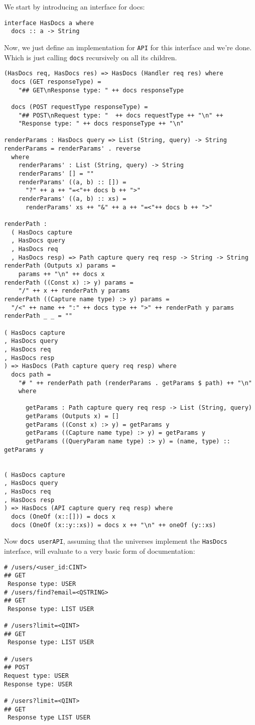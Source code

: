 \documentclass[12pt,a4paper]{article}
\begin{document}
We start by introducing an interface for docs:
\begin{verbatim}
interface HasDocs a where
  docs :: a -> String
\end{verbatim}
Now, we just define an implementation for \texttt{API} for this interface and we're done. Which is just calling \texttt{docs} recursively on all its children.

\begin{verbatim}
(HasDocs req, HasDocs res) => HasDocs (Handler req res) where
  docs (GET responseType) =
    "## GET\nResponse type: " ++ docs responseType

  docs (POST requestType responseType) =
    "## POST\nRequest type: "  ++ docs requestType ++ "\n" ++
    "Response type: " ++ docs responseType ++ "\n"

renderParams : HasDocs query => List (String, query) -> String
renderParams = renderParams' . reverse
  where
    renderParams' : List (String, query) -> String
    renderParams' [] = ""
    renderParams' ((a, b) :: []) =
      "?" ++ a ++ "=<"++ docs b ++ ">"
    renderParams' ((a, b) :: xs) =
      renderParams' xs ++ "&" ++ a ++ "=<"++ docs b ++ ">"

renderPath : 
  ( HasDocs capture
  , HasDocs query
  , HasDocs req
  , HasDocs resp) => Path capture query req resp -> String -> String
renderPath (Outputs x) params = 
    params ++ "\n" ++ docs x
renderPath ((Const x) :> y) params =
    "/" ++ x ++ renderPath y params
renderPath ((Capture name type) :> y) params =
  "/<" ++ name ++ ":" ++ docs type ++ ">" ++ renderPath y params
renderPath _ _ = ""

( HasDocs capture
, HasDocs query
, HasDocs req
, HasDocs resp
) => HasDocs (Path capture query req resp) where
  docs path =
    "# " ++ renderPath path (renderParams . getParams $ path) ++ "\n"
    where

      getParams : Path capture query req resp -> List (String, query)
      getParams (Outputs x) = []
      getParams ((Const x) :> y) = getParams y
      getParams ((Capture name type) :> y) = getParams y
      getParams ((QueryParam name type) :> y) = (name, type) :: getParams y


( HasDocs capture
, HasDocs query
, HasDocs req
, HasDocs resp
) => HasDocs (API capture query req resp) where
  docs (OneOf (x::[])) = docs x
  docs (OneOf (x::y::xs)) = docs x ++ "\n" ++ oneOf (y::xs)
\end{verbatim}

Now \texttt{docs userAPI}, assuming that the universes implement
the \texttt{HasDocs} interface, will evaluate to a very basic form of documentation:
\begin{verbatim}
# /users/<user_id:CINT>
## GET
 Response type: USER
# /users/find?email=<QSTRING>
## GET
 Response type: LIST USER

# /users?limit=<QINT>
## GET
 Response type: LIST USER

# /users
## POST
Request type: USER
Response type: USER

# /users?limit=<QINT>
## GET
 Response type LIST USER
\end{verbatim}
\end{document}

